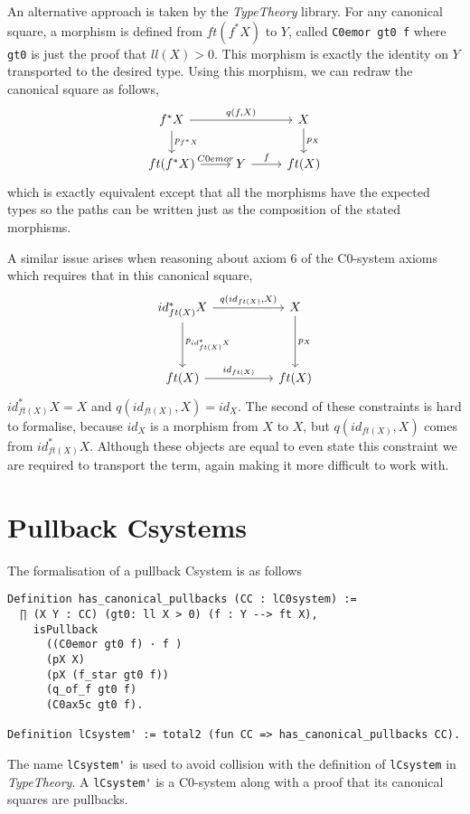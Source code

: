 An alternative approach is taken by the \textit{TypeTheory} library. For any
canonical square, a morphism is defined from $ft(f^*X)$ to $Y$, called 
\verb|C0emor gt0 f| where \verb|gt0| is just the proof that $ll(X)>0$. This
morphism is exactly the identity on $Y$ transported to the desired type. Using
this morphism, we can redraw the canonical square as follows,
\[
\begin{tikzcd}
    f^*X\ar[rr,"{q(f,X)}"]\ar[d,"p_{f^*X}"]&&X\ar[d,"p_X"] \\
    ft(f^*X)\ar[r,"C0emor"]&Y\ar[r,"f"]&ft(X)
\end{tikzcd}
\]
which is exactly equivalent except that all the morphisms have the expected
types so the paths can be written just as the composition of the stated
morphisms.

A similar issue arises when reasoning about axiom 6 of the C0-system axioms
which requires that in this canonical square,
\[
\begin{tikzcd}[sep=huge]
    {id_{ft(X)}^*X}
    \ar[r, "{q(id_{ft(X)}, X)}"]
    \ar[d, "p_{id_{ft(X)}^*X}"]&
    X\ar[d, "p_X"] \\
    ft(X)
    \ar[r, "id_{ft(X)}"]&
    ft(X)
\end{tikzcd}
\]
${id_{ft(X)}^*X} = X$ and $q(id_{ft(X)}, X) = id_X$. The second of these
constraints is hard to formalise, because $id_X$ is a morphism from $X$ to $X$,
but $q(id_{ft(X)}, X)$ comes from $id_{ft(X)}^*X$. Although these objects are
equal to even state this constraint we are required to transport the term, again
making it more difficult to work with.

\section{Pullback Csystems}
The formalisation of a pullback Csystem is as follows
\begin{lstlisting}
Definition has_canonical_pullbacks (CC : lC0system) := 
  ∏ (X Y : CC) (gt0: ll X > 0) (f : Y --> ft X), 
    isPullback 
      ((C0emor gt0 f) · f )
      (pX X) 
      (pX (f_star gt0 f))
      (q_of_f gt0 f)
      (C0ax5c gt0 f).

Definition lCsystem' := total2 (fun CC => has_canonical_pullbacks CC).
\end{lstlisting}

The name \verb|lCsystem'| is used to avoid collision with the definition of
\verb|lCsystem| in \textit{TypeTheory}. A \verb|lCsystem'| is a C0-system along
with a proof that its canonical squares are pullbacks.

